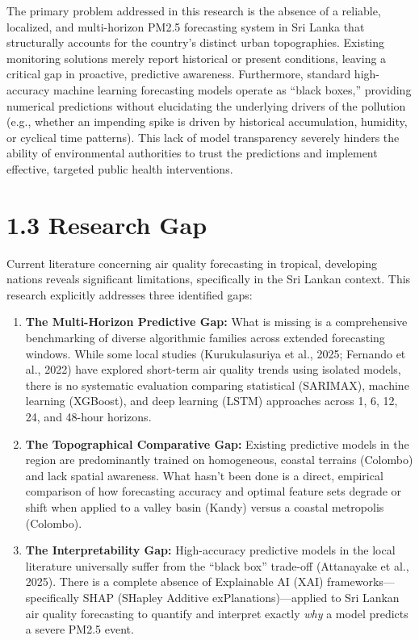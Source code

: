 The primary problem addressed in this research is the absence of a
reliable, localized, and multi-horizon PM2.5 forecasting system in Sri
Lanka that structurally accounts for the country's distinct urban
topographies. Existing monitoring solutions merely report historical or
present conditions, leaving a critical gap in proactive, predictive
awareness. Furthermore, standard high-accuracy machine learning
forecasting models operate as ``black boxes,'' providing numerical
predictions without elucidating the underlying drivers of the pollution
(e.g., whether an impending spike is driven by historical accumulation,
humidity, or cyclical time patterns). This lack of model transparency
severely hinders the ability of environmental authorities to trust the
predictions and implement effective, targeted public health
interventions.

\section{1.3 Research Gap}\label{research-gap}

Current literature concerning air quality forecasting in tropical,
developing nations reveals significant limitations, specifically in the
Sri Lankan context. This research explicitly addresses three identified
gaps:

\begin{enumerate}
\def\labelenumi{\arabic{enumi}.}
\tightlist
\item
  \textbf{The Multi-Horizon Predictive Gap:} What is missing is a
  comprehensive benchmarking of diverse algorithmic families across
  extended forecasting windows. While some local studies (Kurukulasuriya
  et al., 2025; Fernando et al., 2022) have explored short-term air
  quality trends using isolated models, there is no systematic
  evaluation comparing statistical (SARIMAX), machine learning
  (XGBoost), and deep learning (LSTM) approaches across 1, 6, 12, 24,
  and 48-hour horizons.
\item
  \textbf{The Topographical Comparative Gap:} Existing predictive models
  in the region are predominantly trained on homogeneous, coastal
  terrains (Colombo) and lack spatial awareness. What hasn't been done
  is a direct, empirical comparison of how forecasting accuracy and
  optimal feature sets degrade or shift when applied to a valley basin
  (Kandy) versus a coastal metropolis (Colombo).
\item
  \textbf{The Interpretability Gap:} High-accuracy predictive models in
  the local literature universally suffer from the ``black box''
  trade-off (Attanayake et al., 2025). There is a complete absence of
  Explainable AI (XAI) frameworks---specifically SHAP (SHapley Additive
  exPlanations)---applied to Sri Lankan air quality forecasting to
  quantify and interpret exactly \emph{why} a model predicts a severe
  PM2.5 event.
\end{enumerate}

